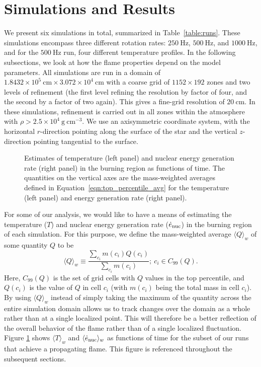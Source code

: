 \documentclass[preprint,times,tighten]{aastex63}
\newcommand{\enucdot}{\dot{e}_{\rm nuc}}
\newcommand{\repavg}[1]{\langle #1 \rangle_w}
\newcommand{\gcc}{\mathrm{g~cm^{-3} }}
\begin{document}
\section{Simulations and Results}\label{Sec:results}


We present six simulations in total, summarized in
Table~\ref{table:runs}.  These simulations encompass three different
rotation rates: $250~\mathrm{Hz}$, $500~\mathrm{Hz}$, and $1000~\mathrm{Hz}$, 
and for the $500~\mathrm{Hz}$ run, four
different temperature profiles.  In the following subsections, we look
at how the flame properties depend on the model parameters.  All
simulations are run in a domain of $1.8432\times 10^5~\mathrm{cm} \times
3.072\times 10^4~\mathrm{cm}$ with a coarse grid of $1152 \times 192$
zones and two levels of refinement (the first level refining the resolution 
by factor of four, and the second by a factor of two again).  This gives a
fine-grid resolution of $20~\mathrm{cm}$.  In these simulations, refinement 
is carried out in all zones within the atmosphere
with $\rho > 2.5\times 10^4~\gcc$. We use an axisymmetric coordinate system, 
with the horizontal $r$-direction pointing along the surface of the star and the 
vertical $z$-direction pointing tangential to the surface.

\begin{figure}
	\caption{\label{fig:maxima}Estimates of temperature (left panel) and nuclear energy generation 
	rate (right panel) in the burning region as functions of time. The quantities on the vertical 
	axes are the mass-weighted averages defined in Equation~\ref{eqn:top_percentile_avg} for the temperature (left panel) and energy generation rate (right panel).}
\end{figure}

For some of our analysis, we would like to have a means of estimating the temperature ($T$) and 
nuclear energy generation rate ($\enucdot$) in the burning region of each simulation. For this 
purpose, we define the mass-weighted average $\repavg{Q}$ of some quantity $Q$ to be
\begin{equation}
	\label{eqn:top_percentile_avg}
	\repavg{Q} \equiv \frac{\sum_{c_i} m(c_i) Q(c_i)}{\sum_{c_i} m(c_i)}; ~c_i \in C_{99}(Q).
\end{equation}
\noindent Here, $C_{99}(Q)$ is the set of grid cells with $Q$ values in the top percentile, and 
$Q(c_i)$ is the value of $Q$ in cell $c_i$ (with $m(c_i)$ being the total mass in cell $c_i$). By 
using $\repavg{Q}$ instead of simply taking the maximum of the quantity across the entire 
simulation domain allows us to track changes over the domain as a whole rather than at a single 
localized point. This will therefore be a better reflection of the overall behavior of the flame 
rather than of a single localized fluctuation. Figure \ref{fig:maxima} shows $\repavg{T}$ and 
$\repavg{\enucdot}$ as functions of time for the subset of our runs that achieve a propagating 
flame. This figure is referenced throughout the subsequent sections.
\end{document}
